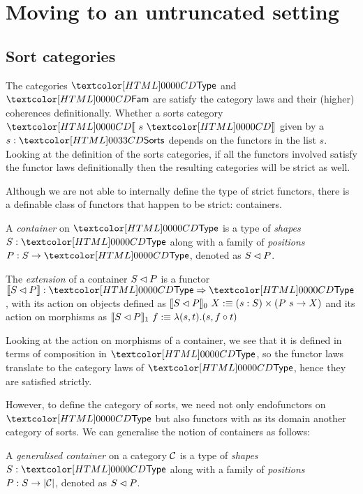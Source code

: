 \chapter{Moving to an untruncated setting}

\section{Sort categories}

The categories $\Type$ and $\Fam$ are satisfy the category laws and
their (higher) coherences definitionally. Whether a sorts category
$\SortCat{s}$ given by a $s : \sortsty$ depends on the functors in the
list $s$. Looking at the definition of the sorts categories, if all
the functors involved satisfy the functor laws definitionally then the
resulting categories will be strict as well.

Although we are not able to internally define the type of strict
functors, there is a definable class of functors that happen to be
strict: containers.

\begin{definition}
  A \emph{container} on $\Type$ is a type of \emph{shapes} $S : \Type$
  along with a family of \emph{positions} $P : S \to \Type$, denoted
  as $S \lhd P$.
\end{definition}

\begin{definition}
  The \emph{extension} of a container $S \lhd P$ is a functor
  $\context{\cont{S}{P}} : \Func{\Type}{\Type}$, with its action on
  objects defined as
  $\llbracket S \lhd P \rrbracket_0\ X :\equiv (s : S) \times (P\ s \to X)$ and
  its action on morphisms as
  $\llbracket S \lhd P \rrbracket_1\ f :\equiv \lambda (s , t) . (s , f \circ
  t)$
\end{definition}

Looking at the action on morphisms of a container, we see that it is
defined in terms of composition in $\Type$, so the functor laws
translate to the category laws of $\Type$, hence they are satisfied
strictly.

However, to define the category of sorts, we need not only
endofunctors on $\Type$ but also functors with as its domain another
category of sorts. We can generalise the notion of containers as
follows:

\begin{definition}
  A \emph{generalised container} on a category $\mathcal{C}$ is a type of
  \emph{shapes} $S : \Type$ along with a family of \emph{positions}
  $P : S \to | \mathcal{C} | $, denoted as $S \lhd P$.
\end{definition}

